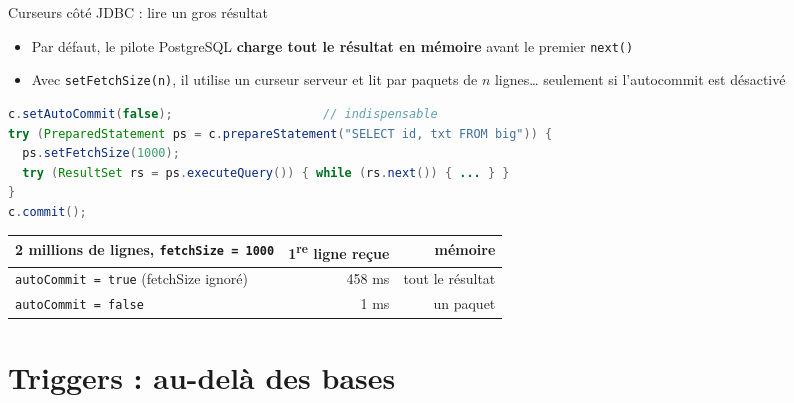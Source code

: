 \documentclass[aspectratio=169,10pt]{beamer}
\begin{document}
\begin{frame}[fragile]{Curseurs c\^ot\'e JDBC : lire un gros r\'esultat}
  \begin{itemize}
    \item Par d\'efaut, le pilote PostgreSQL \textbf{charge tout le r\'esultat en m\'emoire} avant le premier \texttt{next()}
    \item Avec \texttt{setFetchSize(n)}, il utilise un curseur serveur et lit par paquets de $n$ lignes\ldots{}
      \alert{seulement si l'autocommit est d\'esactiv\'e}
  \end{itemize}
\begin{lstlisting}[language=Java]
c.setAutoCommit(false);                     // indispensable
try (PreparedStatement ps = c.prepareStatement("SELECT id, txt FROM big")) {
  ps.setFetchSize(1000);
  try (ResultSet rs = ps.executeQuery()) { while (rs.next()) { ... } }
}
c.commit();
\end{lstlisting}
  \begin{datacard}
    \small
    \begin{tabular}{@{}lrr@{}}
      \toprule
      \textbf{2 millions de lignes, \texttt{fetchSize = 1000}} & \textbf{1\textsuperscript{re} ligne re\c{c}ue} & \textbf{m\'emoire} \\
      \midrule
      \texttt{autoCommit = true} (fetchSize ignor\'e) & 458 ms & tout le r\'esultat \\
      \texttt{autoCommit = false} & \alert{1 ms} & un paquet \\
      \bottomrule
    \end{tabular}
  \end{datacard}
\end{frame}

\section{Triggers : au-del\`a des bases}
\end{document}
